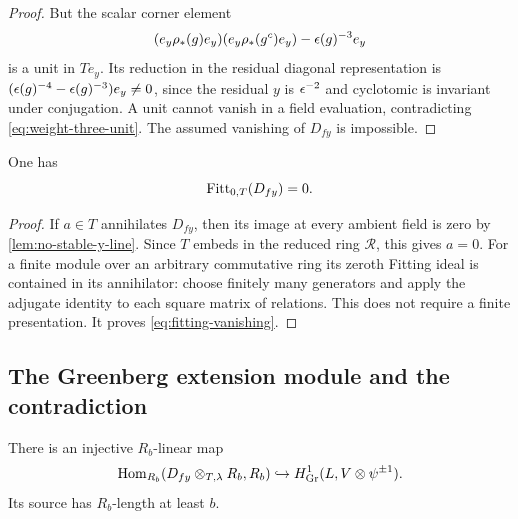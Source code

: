\begin{proof}
But the scalar corner element
\[
 (e_y\rho_*(g)e_y)(e_y\rho_*(g^c)e_y)
                      -\epsilon(g)^{-3}e_y
\]
is a unit in $T e_y$.  Its reduction in the residual diagonal
representation is
$(\epsilon(g)^{-4}-\epsilon(g)^{-3})e_y\ne0$, since the residual $y$ is
$\epsilon^{-2}$ and cyclotomic is invariant under conjugation.
A unit cannot vanish in a field evaluation, contradicting
\cref{eq:weight-three-unit}.  The assumed vanishing of $D_{fy}$
is impossible.
\end{proof}

\begin{corollary}
\label{cor:fitting-vanishing}
One has
\begin{equation}
                       \operatorname{Fitt}_{0,T}(D_{fy})=0.
 \label{eq:fitting-vanishing}
\end{equation}
\end{corollary}

\begin{proof}
If $a\in T$ annihilates $D_{fy}$, then its image at every ambient
field is zero by \cref{lem:no-stable-y-line}.  Since $T$ embeds in
the reduced ring $\mathcal R$, this gives $a=0$.
For a finite module over an arbitrary commutative ring its zeroth
Fitting ideal is contained in its annihilator: choose finitely many
generators and apply the adjugate identity to each square matrix of
relations.  This does not require a finite presentation.  It proves
\cref{eq:fitting-vanishing}.
\end{proof}

\subsection{The Greenberg extension module and the contradiction}

\begin{proposition}
\label{prop:extension-extraction}
There is an injective $R_b$-linear map
\begin{equation}
 \operatorname{Hom}_{R_b}(D_{fy}\otimes_{T,\lambda}R_b,R_b)
       \hookrightarrow
 H^1_{\mathrm{Gr}}(L,V\otimes\psi^{\pm1}).
 \label{eq:green-injection}
\end{equation}
Its source has $R_b$-length at least $b$.
\end{proposition}

